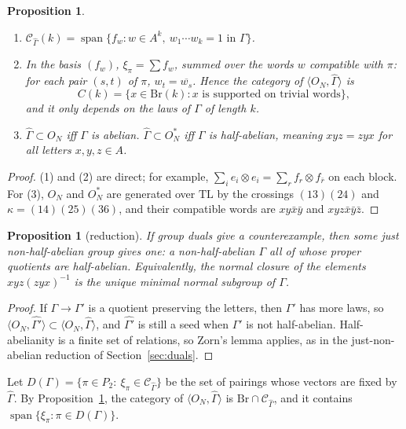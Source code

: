 \documentclass[11pt]{amsart}
\newtheorem{proposition}[theorem]{Proposition}
\theoremstyle{definition}
\theoremstyle{remark}
\theoremstyle{plain}
\numberwithin{equation}{section}
\numberwithin{table}{section}
\newcommand{\TL}{\mathrm{TL}}
\newcommand{\Br}{\mathrm{Br}}
\DeclareMathOperator{\spn}{span}
\begin{document}
\begin{proposition}\label{prop:gdbasic}
\leavevmode
\begin{enumerate}
\item $\mathcal C_{\widehat\Gamma}(k)=\spn\{f_w:w\in A^k,\ w_1\cdots w_k=1\text{ in }\Gamma\}$.
\item In the basis $(f_w)$, $\xi_\pi=\sum f_w$, summed over the words $w$ \emph{compatible} with $\pi$: for each pair
$(s,t)$ of $\pi$, $w_t=\overline{w_s}$. Hence the category of $\langle O_N,\widehat\Gamma\rangle$ is
\[
C(k)=\{x\in\Br(k):x\text{ is supported on trivial words}\},
\]
and it only depends on the laws of $\Gamma$ of length $k$.
\item $\widehat\Gamma\subset O_N$ iff $\Gamma$ is abelian. $\widehat\Gamma\subset O_N^*$ iff $\Gamma$ is
\emph{half-abelian}, meaning $xyz=zyx$ for all letters $x,y,z\in A$.
\end{enumerate}
\end{proposition}

\begin{proof}
(1) and (2) are direct; for example, $\sum_ie_i\otimes e_i=\sum_rf_r\otimes f_{\bar r}$ on each block. For (3), $O_N$ and
$O_N^*$ are generated over $\TL$ by the crossings $(13)(24)$ and $\kappa=(14)(25)(36)$, and their compatible words are
$xy\bar x\bar y$ and $xyz\bar x\bar y\bar z$.
\end{proof}

\begin{proposition}[reduction]\label{prop:jnha}
If group duals give a counterexample, then some \emph{just non-half-abelian} group gives one: a non-half-abelian $\Gamma$
all of whose proper quotients are half-abelian. Equivalently, the normal closure of the elements $xyz(zyx)^{-1}$ is the
unique minimal normal subgroup of $\Gamma$.
\end{proposition}

\begin{proof}
If $\Gamma\to\Gamma'$ is a quotient preserving the letters, then $\Gamma'$ has more laws, so
$\langle O_N,\widehat{\Gamma'}\rangle\subset\langle O_N,\widehat\Gamma\rangle$, and $\widehat{\Gamma'}$ is still a seed
when $\Gamma'$ is not half-abelian. Half-abelianity is a finite set of relations, so Zorn's lemma applies, as in the
just-non-abelian reduction of Section~\ref{sec:duals}.
\end{proof}

Let $D(\Gamma)=\{\pi\in P_2:\ \xi_\pi\in\mathcal C_{\widehat\Gamma}\}$ be the set of pairings whose vectors are fixed by $\widehat\Gamma$. By Proposition~\ref{prop:gdbasic}, the category of $\langle O_N,\widehat\Gamma\rangle$ is $\Br\cap\mathcal C_{\widehat\Gamma}$, and it contains $\spn\{\xi_\pi:\pi\in D(\Gamma)\}$.
\end{document}

